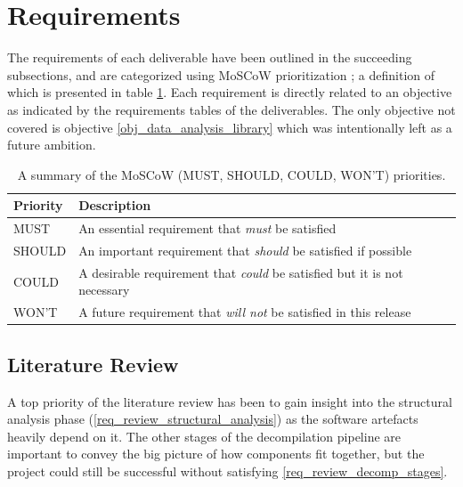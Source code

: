 \documentclass[12pt, a4paper]{article}
\begin{document}

\section{Requirements}

The requirements of each deliverable have been outlined in the succeeding subsections, and are categorized using MoSCoW prioritization \cite{MoSCoW_analysis}; a definition of which is presented in table \ref{MoSCoW_priorities}. Each requirement is directly related to an objective as indicated by the requirements tables of the deliverables. The only objective not covered is objective \ref{obj_data_analysis_library} which was intentionally left as a future ambition.

\begin{table}[htbp]
	\begin{center}
		\begin{tabular}{|l|l|}
			\hline
			Priority & Description \\
			\hline
			MUST & An essential requirement that \textit{must} be satisfied \\
			SHOULD & An important requirement that \textit{should} be satisfied if possible \\
			COULD & A desirable requirement that \textit{could} be satisfied but it is not necessary \\
			WON'T & A future requirement that \textit{will not} be satisfied in this release \\
			\hline
		\end{tabular}
	\end{center}
	\caption{A summary of the MoSCoW (MUST, SHOULD, COULD, WON'T) priorities.}
	\label{MoSCoW_priorities}
\end{table}


\subsection{Literature Review}

A top priority of the literature review has been to gain insight into the structural analysis phase (\ref{req_review_structural_analysis}) as the software artefacts heavily depend on it. The other stages of the decompilation pipeline are important to convey the big picture of how components fit together, but the project could still be successful without satisfying \ref{req_review_decomp_stages}.
\end{document}

